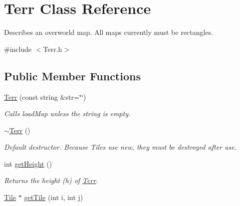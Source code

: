 \hypertarget{class_terr}{}\section{Terr Class Reference}
\label{class_terr}


Describes an overworld map. All maps currently must be rectangles.  




{\ttfamily \#include $<$Terr.\+h$>$}

\subsection*{Public Member Functions}
\begin{DoxyCompactItemize}
\item 
\hyperlink{class_terr_a947a7229cb37a0e87d340f6b88f46994}{Terr} (const string \&str=\char`\"{}\char`\"{})\hypertarget{class_terr_a947a7229cb37a0e87d340f6b88f46994}{}\label{class_terr_a947a7229cb37a0e87d340f6b88f46994}

\begin{DoxyCompactList}\small\item\em Calls load\+Map unless the string is empty. \end{DoxyCompactList}\item 
\hyperlink{class_terr_a8b68000bbfdc821e364bdb89f4465c17}{$\sim$\+Terr} ()\hypertarget{class_terr_a8b68000bbfdc821e364bdb89f4465c17}{}\label{class_terr_a8b68000bbfdc821e364bdb89f4465c17}

\begin{DoxyCompactList}\small\item\em Default destructor. Because Tiles use new, they must be destroyed after use. \end{DoxyCompactList}\item 
int \hyperlink{class_terr_a0ef7c8147e12a2291fc84d9ebc67a8df}{get\+Height} ()\hypertarget{class_terr_a0ef7c8147e12a2291fc84d9ebc67a8df}{}\label{class_terr_a0ef7c8147e12a2291fc84d9ebc67a8df}

\begin{DoxyCompactList}\small\item\em Returns the height (h) of \hyperlink{class_terr}{Terr}. \end{DoxyCompactList}\item 
\hyperlink{class_tile}{Tile} $\ast$ \hyperlink{class_terr_a1ca3548cb10880ae8ac01362d1f3116a}{get\+Tile} (int i, int j)\hypertarget{class_terr_a1ca3548cb10880ae8ac01362d1f3116a}{}\label{class_terr_a1ca3548cb10880ae8ac01362d1f3116a}


\end{DoxyCompactItemize}

